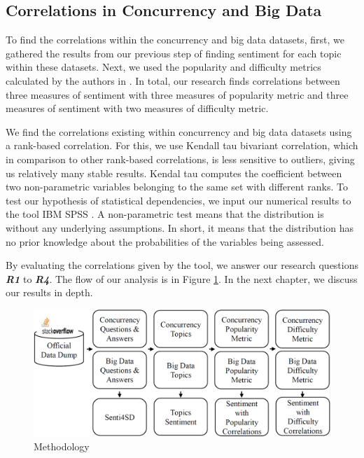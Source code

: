 \subsection{Correlations in Concurrency and Big Data}
\label{correlations}
To find the correlations within the concurrency and big data datasets, first, we gathered the results from our previous step of finding sentiment for each topic within these datasets. Next, we used the popularity and difficulty metrics calculated by the authors in \cite{ahmed2018concurrency, bagherzadeh2019going}. In total, our research finds correlations between three measures of sentiment with three measures of popularity metric and three measures of sentiment with two measures of difficulty metric. 

We find the correlations existing within concurrency and big data datasets using a rank-based correlation. For this, we use Kendall tau bivariant correlation, which in comparison to other rank-based correlations, is less sensitive to outliers, giving us relatively many stable results. Kendal tau computes the coefficient between two non-parametric variables belonging to the same set with different ranks. To test our hypothesis of statistical dependencies, we input our numerical results to the tool IBM SPSS \cite{IBM2019}. A non-parametric test means that the distribution is without any underlying assumptions. In short, it means that the distribution has no prior knowledge about the probabilities of the variables being assessed.

By evaluating the correlations given by the tool, we answer our research questions \emph{\textbf{R1}} to \emph{\textbf{R4}}. The flow of our analysis is in Figure \ref{last}. In the next chapter, we discuss our results in depth.

\begin{figure}[h!tb]
\centering
\includegraphics{Images/methodology}
\caption{Methodology}
\label{last}
\end{figure}